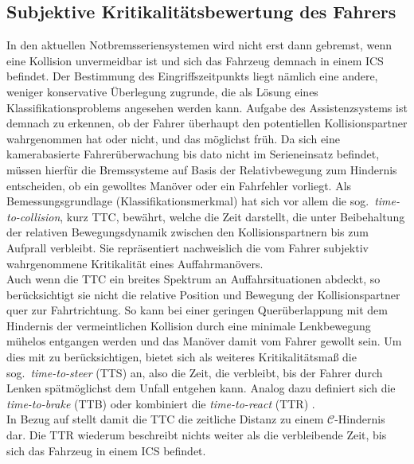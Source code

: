 		
		
\subsection{Subjektive Kritikalitätsbewertung des Fahrers} \label{sec:ttc} %
In den aktuellen Notbremsseriensystemen wird nicht erst dann gebremst, wenn eine Kollision unvermeidbar ist \cite{reinisch2012diss} und sich das Fahrzeug demnach in einem ICS befindet. Der Bestimmung des Eingriffszeitpunkts liegt nämlich eine andere, weniger konservative Überlegung zugrunde, die als Lösung eines Klassifikationsproblems angesehen werden kann. Aufgabe des Assistenzsystems ist demnach zu erkennen, ob der Fahrer überhaupt den potentiellen Kollisionspartner wahrgenommen hat oder nicht, und das möglichst früh. 
Da sich eine kamerabasierte Fahrerüberwachung bis dato nicht im Serieneinsatz befindet, %
müssen hierfür die Bremssysteme auf Basis der Relativbewegung zum Hindernis entscheiden, ob ein gewolltes Manöver oder ein Fahrfehler vorliegt. Als Bemessungsgrundlage (Klassifikationsmerkmal) hat sich vor allem die sog.\ \emph{time-to-collision}, kurz TTC, bewährt, welche die Zeit darstellt, die unter Beibehaltung der relativen Bewegungsdynamik zwischen den Kollisionspartnern bis zum Aufprall verbleibt. Sie repräsentiert nachweislich die vom Fahrer subjektiv wahrgenommene Kritikalität eines Auffahrmanövers. \\
Auch wenn die TTC ein breites Spektrum an Auffahrsituationen abdeckt, so berücksichtigt sie nicht die relative Position und Bewegung der Kollisionspartner quer zur Fahrtrichtung. So kann bei einer geringen Querüberlappung mit dem Hindernis der vermeintlichen Kollision durch eine minimale Lenkbewegung mühelos entgangen werden und das Manöver damit vom Fahrer gewollt sein. Um dies mit zu berücksichtigen, bietet sich als weiteres Kritikalitätsmaß die sog.\ \emph{time-to-steer} (TTS) an, also die Zeit, die verbleibt, bis der Fahrer durch Lenken spätmöglichst dem Unfall entgehen kann. Analog dazu definiert sich die \emph{time-to-brake} (TTB) oder kombiniert die \emph{time-to-react} (TTR) \cite{Hillenbrand2006}. \\
In Bezug auf  stellt damit die TTC die zeitliche Distanz zu einem $\mathcal{C}$-Hindernis dar. Die TTR wiederum beschreibt nichts weiter als die verbleibende Zeit, bis sich das Fahrzeug in einem ICS befindet.



